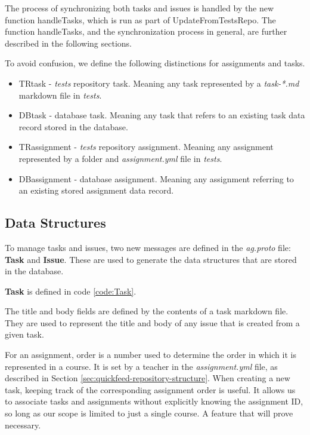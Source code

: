 The process of synchronizing both tasks and issues is handled by the new function handleTasks, which is run as part of UpdateFromTestsRepo.
The function handleTasks, and the synchronization process in general, are further described in the following sections. 

To avoid confusion, we define the following distinctions for assignments and tasks.
\begin{itemize}
    \item TRtask - \textit{tests} repository task. Meaning any task represented by a \textit{task-*.md} markdown file in \textit{tests}.
    \item DBtask - database task. Meaning any task that refers to an existing task data record stored in the database.
    \item TRassignment - \textit{tests} repository assignment. Meaning any assignment represented by a folder and \textit{assignment.yml} file
    in \textit{tests}. 
    \item DBassignment - database assignment. Meaning any assignment referring to an existing stored assignment data record.
\end{itemize}

\subsection{Data Structures}
\label{sec:tasks-and-issues-data-structures}

To manage tasks and issues, two new messages are defined in the \textit{ag.proto} file: \textbf{Task} and \textbf{Issue}.
These are used to generate the data structures that are stored in the database.

\textbf{Task} is defined in code \ref{code:Task}.



The title and body fields are defined by the contents of a task markdown file.
They are used to represent the title and body of any issue that is created from a given task.

For an assignment, order is a number used to determine the order in which it is represented in a course.
It is set by a teacher in the \textit{assignment.yml} file, as described in Section \ref{sec:quickfeed-repository-structure}.
When creating a new task, keeping track of the corresponding assignment order is useful.
It allows us to associate tasks and assignments without explicitly knowing the assignment ID, so long as our scope is limited to just a single course.
A feature that will prove necessary.


